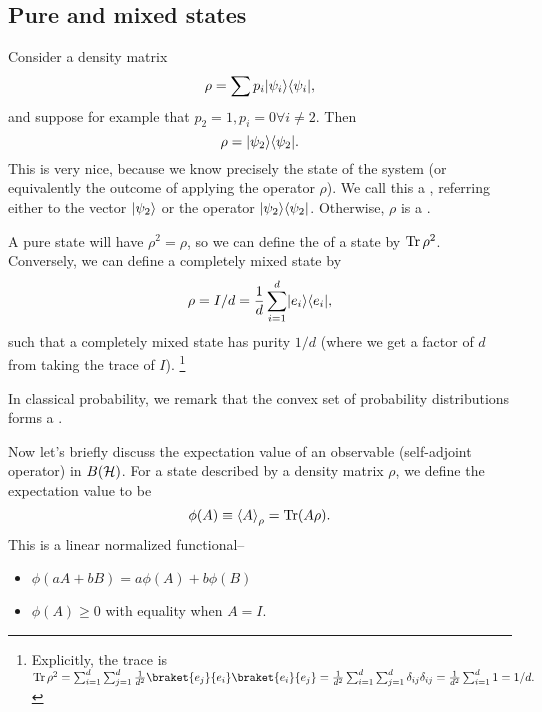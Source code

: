 \subsection*{Pure and mixed states} 
Consider a density matrix
\begin{equation}
    \rho = \sum p_i \lvert\psi_i\rangle\langle\psi_i\rvert,
\end{equation}
and suppose for example that $p_2=1, p_i=0 \forall i\neq 2$. Then
\begin{equation}
    \rho=\lvert\psi_2\rangle\langle\psi_2\rvert.
\end{equation}
This is very nice, because we know precisely the state of the system (or equivalently the outcome of applying the operator $\rho$). We call this a , referring either to the vector $\lvert\psi_2\rangle$ or the operator $\lvert\psi_2\rangle\langle\psi_2\rvert$. Otherwise, $\rho$ is a .

A pure state will have $\rho^2 = \rho$, so we can define the  of a state by $\operatorname{Tr} \rho^2$. Conversely, we can define a completely mixed state by
\begin{equation}
    \rho = I/d=\frac{1}{d} \sum_{i=1}^d \lvert e_i\rangle \langle e_i\rvert,
\end{equation}
such that a completely mixed state has purity $1/d$ (where we get a factor of $d$ from taking the trace of $I$).%
    \footnote{Explicitly, the trace is $\Tr \rho^2 = \sum_{i=1}^d \sum_{j=1}^d \frac{1}{d^2} \braket{e_j}{e_i}\braket{e_i}{e_j}=\frac{1}{d^2}\sum_{i=1}^d \sum_{j=1}^d \delta_{ij} \delta_{ij} = \frac{1}{d^2}\sum_{i=1}^d 1 = 1/d.$
    }

In classical probability, we remark that the convex set of probability distributions forms a .

Now let's briefly discuss the expectation value of an observable (self-adjoint operator) in $B(\mathcal H)$. For a state described by a density matrix $\rho$, we define the expectation value to be
\begin{equation}
    \phi(A) \equiv \left< A \right>_\rho =\operatorname{Tr}(A \rho).
\end{equation}
This is a linear normalized functional--
\begin{itemize}
    \item $\phi(aA +b B) = a\phi(A) + b\phi(B)$
    \item $\phi(A)\geq 0$ with equality when $A=I$.
\end{itemize}